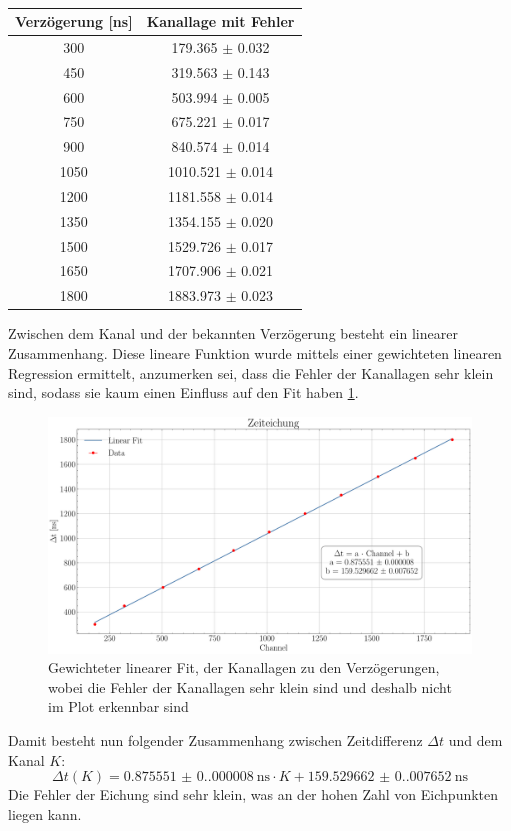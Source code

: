 \documentclass[12pt,a4paper,ngerman]{report}
\begin{document}
	\begin{table}[]
		\centering
		\begin{tabular}{cc}
			\toprule[1.5pt]
			Verzögerung [\si{\nano \s}] & Kanallage mit Fehler\\ 
			\midrule
			300	 & 179.365 $\pm$ 0.032 \\
			450	 & 319.563 $\pm$ 0.143 \\
			600	 & 503.994 $\pm$ 0.005 \\
			750	 & 675.221 $\pm$ 0.017 \\
			900	 & 840.574 $\pm$ 0.014 \\
			1050	 & 1010.521 $\pm$ 0.014 \\
			1200	 & 1181.558 $\pm$ 0.014 \\
			1350	 & 1354.155 $\pm$ 0.020 \\
			1500	 & 1529.726 $\pm$ 0.017 \\
			1650	 & 1707.906 $\pm$ 0.021 \\
			1800	 & 1883.973 $\pm$ 0.023 \\

			
			\bottomrule[1.5pt]
		\end{tabular}
		\caption{}
		\label{table:TimeFits}
	\end{table}
	Zwischen dem Kanal und der bekannten Verzögerung besteht ein linearer Zusammenhang. Diese lineare Funktion wurde mittels einer gewichteten linearen Regression ermittelt, anzumerken sei, dass die Fehler der Kanallagen sehr klein sind, sodass sie kaum einen Einfluss auf den Fit haben \ref{img:timeLinearFit}.
	\begin{figure}[ht]
		\centering
		\includegraphics[width=\textwidth]{Bilder/timeLinearFit.pdf}		
		\caption{Gewichteter linearer Fit, der Kanallagen zu den Verzögerungen, wobei die Fehler der Kanallagen sehr klein sind und deshalb nicht im Plot erkennbar sind}
		\label{img:timeLinearFit}
	\end{figure}
	Damit besteht nun folgender Zusammenhang zwischen Zeitdifferenz $\Delta t$ und dem Kanal $K$:
	\begin{equation}
		\Delta t(K) = \SI{0.875551(0.000008)}{\nano \s} \cdot K + \SI{159.529662(0.007652)}{\nano \s}
	\end{equation}
	Die Fehler der Eichung sind sehr klein, was an der hohen Zahl von Eichpunkten liegen kann.
\end{document}
